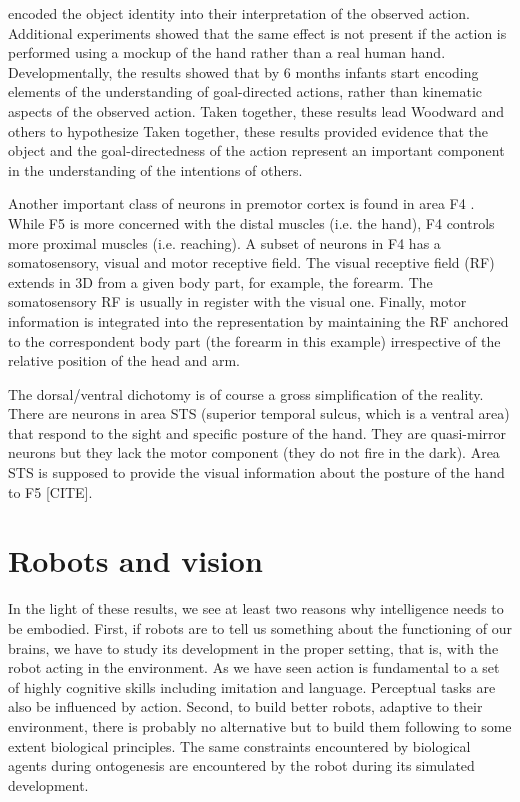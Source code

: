 encoded the object identity into their interpretation of the observed
action. Additional experiments showed that the same effect is not
present if the action is performed using a mockup of the hand rather
than a real human hand. Developmentally, the results showed that by 6
months infants start encoding elements of the understanding of
goal-directed actions, rather than kinematic aspects of the observed
action.
%
\fi
%
\ifrevised
Taken together, these results 
lead Woodward and others to hypothesize
\else
Taken together, these results provided evidence
\fi
that the object and the goal-directedness of the action represent 
an important component in the understanding of the intentions of others.


\ifverbose
Another important class of neurons in premotor cortex is found in area
F4 \cite{fogassi96coding}. While F5 is more concerned with the distal
muscles (i.e. the hand), F4 controls more proximal muscles
(i.e. reaching). A subset of neurons in F4 has a somatosensory, visual
and motor receptive field. The visual receptive field (RF) extends in
3D from a given body part, for example, the forearm. The somatosensory
RF is usually in register with the visual one. Finally, motor
information is integrated into the representation by maintaining the
RF anchored to the correspondent body part (the forearm in this
example) irrespective of the relative position of the head and arm.
\fi

\ifverbose
The dorsal/ventral dichotomy is of course a gross simplification of
the reality.  There are neurons in area STS (superior temporal sulcus,
which is a ventral area) that respond to the sight and specific
posture of the hand. They are quasi-mirror neurons but they lack the
motor component (they do not fire in the dark).  Area STS is supposed
to provide the visual information about the posture of the hand to F5
[CITE].
\fi

\ifverbose

\section{Robots and vision}

In the light of these results, we see at least two reasons why
intelligence needs to be embodied. First, if robots are to tell us
something about the functioning of our brains, we have to study its
development in the proper setting, that is, with the robot acting in
the environment. As we have seen action is fundamental to a set of
highly cognitive skills including imitation and language. Perceptual
tasks are also be influenced by action. Second, to build better
robots, adaptive to their environment, there is probably no
alternative but to build them following to some extent biological
principles. The same constraints encountered by biological agents
during ontogenesis are encountered by the robot during its simulated
development.

